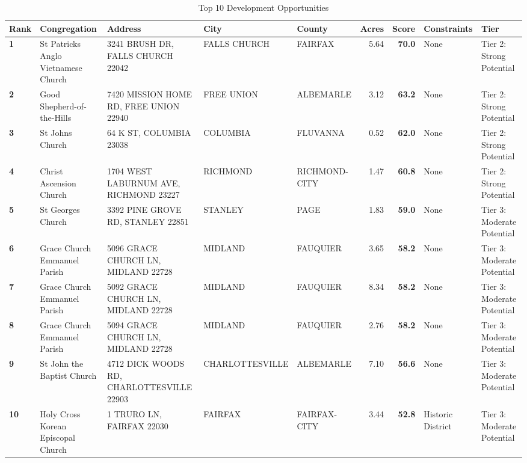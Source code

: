 \documentclass[
  letterpaper,
  DIV=11,
  numbers=noendperiod,
  oneside]{scrreprt}
\begin{document}

\begin{longtable}[t]{>{\centering\arraybackslash}p{3em}llllr>{}rll}

\caption{\label{tbl-top-dev}Top 10 Development Opportunities}

\tabularnewline

\toprule
Rank & Congregation & Address & City & County & Acres & Score & Constraints & Tier\\
\midrule
\textbf{1} & St Patricks Anglo Vietnamese Church & 3241 BRUSH DR, FALLS CHURCH 22042 & FALLS CHURCH & FAIRFAX & 5.64 & \textcolor[HTML]{e9ab3f}{\textbf{70.0}} & None & Tier 2: Strong Potential\\
\textbf{2} & Good Shepherd-of-the-Hills & 7420 MISSION HOME RD, FREE UNION 22940 & FREE UNION & ALBEMARLE & 3.12 & \textcolor[HTML]{e9ab3f}{\textbf{63.2}} & None & Tier 2: Strong Potential\\
\textbf{3} & St Johns Church & 64 K ST, COLUMBIA 23038 & COLUMBIA & FLUVANNA & 0.52 & \textcolor[HTML]{e9ab3f}{\textbf{62.0}} & None & Tier 2: Strong Potential\\
\textbf{4} & Christ Ascension Church & 1704 WEST LABURNUM AVE, RICHMOND 23227 & RICHMOND & RICHMOND-CITY & 1.47 & \textcolor[HTML]{e9ab3f}{\textbf{60.8}} & None & Tier 2: Strong Potential\\
\textbf{5} & St Georges Church & 3392 PINE GROVE RD, STANLEY 22851 & STANLEY & PAGE & 1.83 & \textcolor[HTML]{e9ab3f}{\textbf{59.0}} & None & Tier 3: Moderate Potential\\
\addlinespace
\textbf{6} & Grace Church Emmanuel Parish & 5096 GRACE CHURCH LN, MIDLAND 22728 & MIDLAND & FAUQUIER & 3.65 & \textcolor[HTML]{e9ab3f}{\textbf{58.2}} & None & Tier 3: Moderate Potential\\
\textbf{7} & Grace Church Emmanuel Parish & 5092 GRACE CHURCH LN, MIDLAND 22728 & MIDLAND & FAUQUIER & 8.34 & \textcolor[HTML]{e9ab3f}{\textbf{58.2}} & None & Tier 3: Moderate Potential\\
\textbf{8} & Grace Church Emmanuel Parish & 5094 GRACE CHURCH LN, MIDLAND 22728 & MIDLAND & FAUQUIER & 2.76 & \textcolor[HTML]{e9ab3f}{\textbf{58.2}} & None & Tier 3: Moderate Potential\\
\textbf{9} & St John the Baptist Church & 4712 DICK WOODS RD, CHARLOTTESVILLE 22903 & CHARLOTTESVILLE & ALBEMARLE & 7.10 & \textcolor[HTML]{e76f52}{\textbf{56.6}} & None & Tier 3: Moderate Potential\\
\textbf{10} & Holy Cross Korean Episcopal Church & 1 TRURO LN, FAIRFAX 22030 & FAIRFAX & FAIRFAX-CITY & 3.44 & \textcolor[HTML]{e76f52}{\textbf{52.8}} & Historic District & Tier 3: Moderate Potential\\
\bottomrule

\end{longtable}
\end{document}
